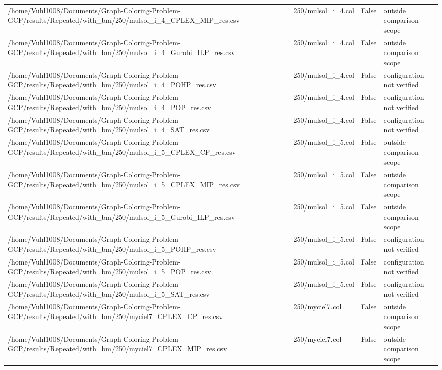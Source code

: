 \begin{table}[htbp]
\begin{tabular}{llll}
/home/Vuhl1008/Documents/Graph-Coloring-Problem-GCP/results/Repeated/with\_bm/250/mulsol\_i\_4\_CPLEX\_MIP\_res.csv & 250/mulsol\_i\_4.col & False & outside comparison scope \\
/home/Vuhl1008/Documents/Graph-Coloring-Problem-GCP/results/Repeated/with\_bm/250/mulsol\_i\_4\_Gurobi\_ILP\_res.csv & 250/mulsol\_i\_4.col & False & outside comparison scope \\
/home/Vuhl1008/Documents/Graph-Coloring-Problem-GCP/results/Repeated/with\_bm/250/mulsol\_i\_4\_POHP\_res.csv & 250/mulsol\_i\_4.col & False & configuration not verified \\
/home/Vuhl1008/Documents/Graph-Coloring-Problem-GCP/results/Repeated/with\_bm/250/mulsol\_i\_4\_POP\_res.csv & 250/mulsol\_i\_4.col & False & configuration not verified \\
/home/Vuhl1008/Documents/Graph-Coloring-Problem-GCP/results/Repeated/with\_bm/250/mulsol\_i\_4\_SAT\_res.csv & 250/mulsol\_i\_4.col & False & configuration not verified \\
/home/Vuhl1008/Documents/Graph-Coloring-Problem-GCP/results/Repeated/with\_bm/250/mulsol\_i\_5\_CPLEX\_CP\_res.csv & 250/mulsol\_i\_5.col & False & outside comparison scope \\
/home/Vuhl1008/Documents/Graph-Coloring-Problem-GCP/results/Repeated/with\_bm/250/mulsol\_i\_5\_CPLEX\_MIP\_res.csv & 250/mulsol\_i\_5.col & False & outside comparison scope \\
/home/Vuhl1008/Documents/Graph-Coloring-Problem-GCP/results/Repeated/with\_bm/250/mulsol\_i\_5\_Gurobi\_ILP\_res.csv & 250/mulsol\_i\_5.col & False & outside comparison scope \\
/home/Vuhl1008/Documents/Graph-Coloring-Problem-GCP/results/Repeated/with\_bm/250/mulsol\_i\_5\_POHP\_res.csv & 250/mulsol\_i\_5.col & False & configuration not verified \\
/home/Vuhl1008/Documents/Graph-Coloring-Problem-GCP/results/Repeated/with\_bm/250/mulsol\_i\_5\_POP\_res.csv & 250/mulsol\_i\_5.col & False & configuration not verified \\
/home/Vuhl1008/Documents/Graph-Coloring-Problem-GCP/results/Repeated/with\_bm/250/mulsol\_i\_5\_SAT\_res.csv & 250/mulsol\_i\_5.col & False & configuration not verified \\
/home/Vuhl1008/Documents/Graph-Coloring-Problem-GCP/results/Repeated/with\_bm/250/myciel7\_CPLEX\_CP\_res.csv & 250/myciel7.col & False & outside comparison scope \\
/home/Vuhl1008/Documents/Graph-Coloring-Problem-GCP/results/Repeated/with\_bm/250/myciel7\_CPLEX\_MIP\_res.csv & 250/myciel7.col & False & outside comparison scope \\

\end{tabular}
\end{table}
